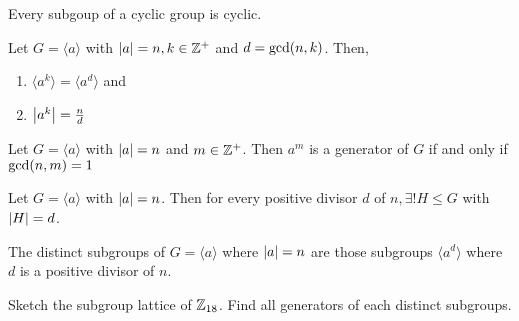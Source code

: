 \begin{theorem}
    Every subgoup of a cyclic group is cyclic.
\end{theorem}

\begin{theorem}
    Let $G = \langle a \rangle$ with $\qty|a| = n, k \in \mathbb{Z}^+$ and $d = \text{gcd}\qty(n, k)$. Then,
    \begin{enumerate}
        \item $\langle a^k \rangle = \langle a^d \rangle$ and
        \item $\qty|a^k| = \frac{n}{d}$
    \end{enumerate}
\end{theorem}

\begin{corollary}
    Let $G = \langle a \rangle $ with $\qty|a| = n$ and $m \in \mathbb{Z}^+$. Then $a^m$ is a generator of $G$ if and only if $\text{gcd} \qty(n, m) = 1$
\end{corollary}

\begin{corollary}
    Let $G = \langle a \rangle$ with $\qty|a| = n$. Then for every positive divisor $d$ of $n, \exists! H \leq G$ with $\qty|H| = d$.
\end{corollary}

\begin{remark}
    The distinct subgroups of $G = \langle a \rangle$ where $\qty|a| = n$ are those subgroups $\langle a^d \rangle$ where $d$ is a positive divisor of $n$.
\end{remark}

\begin{exercise}
    Sketch the subgroup lattice of $\mathbb{Z}_{18}$. Find all generators of each distinct subgroups.
\end{exercise}

